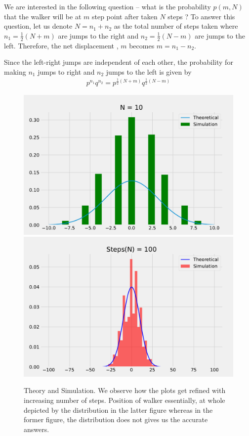 \documentclass[showpacs,amsmath,amssymb,aps,pre,twocolumn]{revtex4-1}
\begin{document}

\noindent
We are interested in the following question -- what is the probability $p(m,N)$ that the walker will be at $m$ step point after taken $N$ steps ? To answer this question, let us denote
$N = n_1 + n_2$ as the total number of steps taken where
$n_1 = \frac{1}{2}(N + m)$ are jumps to the right and
$n_2 = \frac{1}{2}(N - m)$ are jumps to the left. Therefore, the net displacement , $m$ becomes $m = n_1 - n_2$.



Since the left-right jumps are independent of each other, the probability for making $n_1$ jumps to right and $n_2$ jumps to the left is given by
\begin{align}
    p^{n_1}q^{n_2} = p^{\frac{1}{2}(N+m)}q^{\frac{1}{2}(N-m)}
\end{align}

\begin{figure}[H]
    \centering
    \includegraphics[scale=0.35]{N_10.pdf}
    \includegraphics[scale = 0.35]{N_100.pdf}
    \caption{Theory and Simulation. We observe how the plots get refined with increasing number of steps. Position of walker essentially, at whole depicted by the distribution in the latter figure whereas in the former figure, the distribution does not gives us the accurate answers.}
    \label{fig:my_label}
\end{figure}
\end{document}
